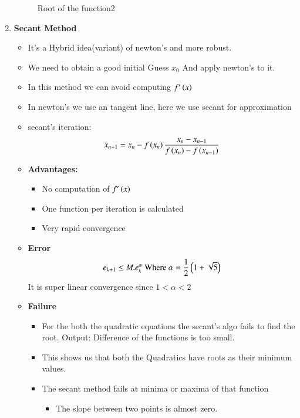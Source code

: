 \documentclass[journal]{IEEEtran}
\numberwithin{equation}{enumi}
\numberwithin{figure}{enumi}
\begin{document}
\begin{enumerate}
\begin{multicols}{2}
\begin{figure}[H]
   \caption{Root of the function2}
\end{figure}
    \end{multicols}
    \item \textbf{Secant Method}
    \begin{itemize}
        \item It's a Hybrid idea(variant) of newton's and more robust.
        \item We need to obtain a good initial Guess $x_0$ And apply newton's to it.
        \item In this method we can avoid computing $f^{\prime}\left(x\right)$
        \item In newton's we use an tangent line, here we use secant for approximation
        \item secant's iteration:
        \begin{align}
            x_{n + 1} = x_n - f\left(x_n\right)\frac{x_n - x_{n - 1}}{f\left(x_n\right) - f\left(x_{n - 1}\right)}
        \end{align}
        \item \textbf{Advantages:}
        \begin{itemize}
            \item No computation of $f^{\prime}\left(x\right)$
            \item One function per iteration is calculated
            \item Very rapid convergence
        \end{itemize}
        \item \textbf{Error}
        \begin{align}
            e_{k + 1} \leq M. e_k^{\alpha} \text{ Where } \alpha = \frac{1}{2}\left(1 + \sqrt{5}\right)
        \end{align}
        It is super linear convergence since $1 < \alpha < 2$\\
        \item \textbf{Failure} 
        \begin{itemize}
            \item For the both the quadratic equations the secant's algo fails to find the root. Output: Difference of the functions is too small.
            \item This shows us that both the Quadratics have roots as their minimum values.
            \item The secant method fails at minima or maxima of that function
            \begin{itemize}
                \item The slope between two points is almost zero.

\end{itemize}
\end{itemize}
\end{itemize}
\end{enumerate}
\end{document}
